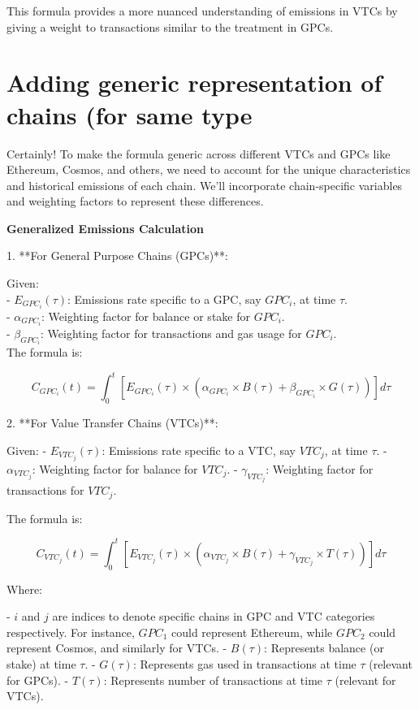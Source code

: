 \documentclass{article}
\begin{document}
This formula provides a more nuanced understanding of emissions in VTCs by giving a weight to transactions similar to the treatment in GPCs.

\section{Adding generic representation of chains (for same type}
Certainly! To make the formula generic across different VTCs and GPCs like Ethereum, Cosmos, and others, we need to account for the unique characteristics and historical emissions of each chain. We'll incorporate chain-specific variables and weighting factors to represent these differences.

\textbf{Generalized Emissions Calculation}

1. **For General Purpose Chains (GPCs)**:

Given: \\
- \( E_{GPC_i}(\tau) \): Emissions rate specific to a GPC, say \( GPC_i \), at time \( \tau \). \\
- \( \alpha_{GPC_i} \): Weighting factor for balance or stake for \( GPC_i \). \\
- \( \beta_{GPC_i} \): Weighting factor for transactions and gas usage for \( GPC_i \). \\

The formula is:

\[ C_{GPC_i}(t) = \int_{0}^{t} [E_{GPC_i}(\tau) \times (\alpha_{GPC_i} \times B(\tau) + \beta_{GPC_i} \times G(\tau))] d\tau \]

2. **For Value Transfer Chains (VTCs)**:

Given:
- \( E_{VTC_j}(\tau) \): Emissions rate specific to a VTC, say \( VTC_j \), at time \( \tau \).
- \( \alpha_{VTC_j} \): Weighting factor for balance for \( VTC_j \).
- \( \gamma_{VTC_j} \): Weighting factor for transactions for \( VTC_j \).

The formula is:

\[ C_{VTC_j}(t) = \int_{0}^{t} [E_{VTC_j}(\tau) \times (\alpha_{VTC_j} \times B(\tau) + \gamma_{VTC_j} \times T(\tau))] d\tau \]

Where:

- \( i \) and \( j \) are indices to denote specific chains in GPC and VTC categories respectively. For instance, \( GPC_1 \) could represent Ethereum, while \( GPC_2 \) could represent Cosmos, and similarly for VTCs.
- \( B(\tau) \): Represents balance (or stake) at time \( \tau \).
- \( G(\tau) \): Represents gas used in transactions at time \( \tau \) (relevant for GPCs).
- \( T(\tau) \): Represents number of transactions at time \( \tau \) (relevant for VTCs).
\end{document}
